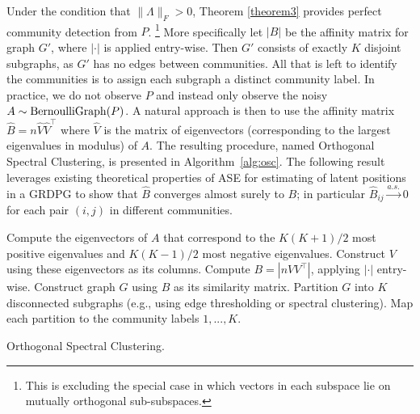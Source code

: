 \documentclass[12pt]{article}
\begin{document}
Under the condition that $\|\Lambda\|_F > 0$, 
Theorem \ref{theorem3} provides perfect community detection from \(P\).
\footnote{This is excluding the special case in which vectors in each 
subspace lie on mutually orthogonal sub-subspaces.}
More specifically let \(|B|\) be the affinity matrix for graph \(G'\), 
where $|\cdot|$ is applied entry-wise. Then
\(G'\) consists of exactly \(K\) disjoint subgraphs, 
as $G'$ has no edges between communities. 
All that is left to identify the communities is 
to assign each subgraph a distinct community label. 
In practice, we do not observe $P$ and instead only observe the noisy
$A \sim \mathrm{BernoulliGraph}(P)$. A natural approach is then to use
the affinity matrix $\hat{B} = n \hat{V} \hat{V}^{\top}$ where
$\hat{V}$ is the matrix of eigenvectors (corresponding to the largest
eigenvalues in modulus) of $A$. The resulting procedure, named
Orthogonal Spectral Clustering, is presented in
Algorithm~\ref{alg:osc}.
The following result leverages existing theoretical properties
of ASE for estimating of latent positions in a GRDPG \citep{rubindelanchy2017statistical} to show that
$\hat{B}$ converges almost surely to $B$; in particular 
 $\hat{B}_{ij} \stackrel{a.s.}{\to} 0$ 
for each pair $(i, j)$ in different communities. 

\begin{algorithm}[tp]
  \label{alg:osc}
  \DontPrintSemicolon
  \SetAlgoLined
    Compute the eigenvectors of $A$ that correspond to the $K (K+1) / 2$ most
    positive eigenvalues and $K (K-1) / 2$ most negative eigenvalues. Construct
    $V$ using these eigenvectors as its columns.\;
    Compute $B = |n V V^\top|$, applying $|\cdot|$ entry-wise.\;
    Construct graph $G$ using $B$ as its similarity matrix.\;
    Partition $G$ into $K$ disconnected subgraphs
    (e.g., using edge thresholding or spectral clustering).\;
    Map each partition to the community labels $1, ..., K$.\;
  \caption{Orthogonal Spectral Clustering.}
\end{algorithm}

\end{document}
